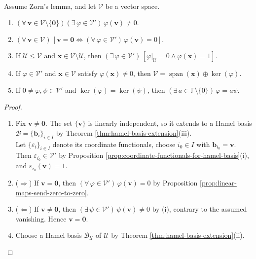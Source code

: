 \begin{proposition} \label{prop:functionals-separate-points} \\
Assume Zorn's lemma, and let $\mathcal{V}$ be a vector space.
\begin{enumerate}[label=(\roman*)]
\setlength{\itemsep}{0pt}
\item $(\forall\,\mathbf{v}\in\mathcal{V}\setminus\{\mathbf{0}\})(\exists\,\varphi\in\mathcal{V}')\,\varphi(\mathbf{v})\neq0$.
\item $(\forall\,\mathbf{v}\in\mathcal{V})\,[\mathbf{v}=\mathbf{0}\iff(\forall\,\varphi\in\mathcal{V}')\,\varphi(\mathbf{v})=0]$.
\item If $\mathcal{U}\leq\mathcal{V}$ and $\mathbf{x}\in\mathcal{V}\setminus\mathcal{U}$, then $(\exists\,\varphi\in\mathcal{V}')\,[\varphi|_{\mathcal{U}}=0\land\varphi(\mathbf{x})=1]$.
\item If $\varphi\in\mathcal{V}'$ and $\mathbf{x}\in\mathcal{V}$ satisfy $\varphi(\mathbf{x})\neq0$, then $\mathcal{V}=\operatorname{span}(\mathbf{x})\oplus\ker(\varphi)$.
\item If $0\neq\varphi,\psi\in\mathcal{V}'$ and $\ker(\varphi)=\ker(\psi)$, then $(\exists\,a\in\mathbb{F}\setminus\{0\})\,\varphi=a\psi$.
\end{enumerate}
\begin{proof}
\begin{enumerate}[label=(\roman*)]
\setlength{\itemsep}{0pt}
\item[$(i)$] Fix $\mathbf{v}\neq\mathbf{0}$. The set $\{\mathbf{v}\}$ is linearly independent, so it extends to a Hamel basis $\mathcal{B}=\{\mathbf{b}_i\}_{i\in I}$ by Theorem \ref{thm:hamel-basis-extension}(iii).\\
Let $\{\varepsilon_i\}_{i\in I}$ denote its coordinate functionals, choose $i_0\in I$ with $\mathbf{b}_{i_0}=\mathbf{v}$. Then $\varepsilon_{i_0}\in\mathcal{V}'$ by Proposition \ref{prop:coordinate-functionals-for-hamel-basis}(i), and $\varepsilon_{i_0}(\mathbf{v})=1$.
\item[$(ii)$] ($\Rightarrow$) If $\mathbf{v}=\mathbf{0}$, then $(\forall\,\varphi\in\mathcal{V}')\,\varphi(\mathbf{v})=0$ by Proposition \ref{prop:linear-maps-send-zero-to-zero}.
\item[$(ii)$] ($\Leftarrow$) If $\mathbf{v}\neq\mathbf{0}$, then $(\exists\,\psi\in\mathcal{V}')\,\psi(\mathbf{v})\neq0$ by (i), contrary to the assumed vanishing. Hence $\mathbf{v}=\mathbf{0}$.
\item[$(iii)$] Choose a Hamel basis $\mathcal{B}_{\mathcal{U}}$ of $\mathcal{U}$ by Theorem \ref{thm:hamel-basis-extension}(ii).\\

\end{enumerate}
\end{proof}
\end{proposition}
